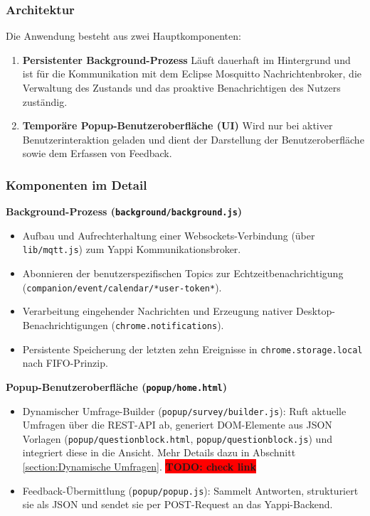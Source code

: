 \documentclass[12pt,a4paper]{report}
\newcommand{\todo}[1]{\colorbox{red}{\textbf{TODO: #1}}\\}
\begin{document}
    \subsubsection{Architektur}
        Die Anwendung besteht aus zwei Hauptkomponenten:
        \begin{enumerate}
          \item \textbf{Persistenter Background-Prozess}
                Läuft dauerhaft im Hintergrund und ist für die Kommunikation mit dem Eclipse Mosquitto Nachrichtenbroker, die Verwaltung des Zustands
                und das proaktive Benachrichtigen des Nutzers zuständig.
          \item \textbf{Temporäre Popup-Benutzeroberfläche (UI)}
                Wird nur bei aktiver Benutzerinteraktion geladen und dient der Darstellung der Benutzeroberfläche sowie dem Erfassen von Feedback.
        \end{enumerate}

    \subsubsection{Komponenten im Detail}
        \textbf{Background-Prozess (\texttt{background/background.js})} \\
            \begin{itemize}
              \item Aufbau und Aufrechterhaltung einer Websockets-Verbindung (über \texttt{lib/mqtt.js}) zum Yappi Kommunikationsbroker.
              \item Abonnieren der benutzerspezifischen Topics zur Echtzeitbenachrichtigung (\texttt{companion/event/calendar/*user-token*}).
              \item Verarbeitung eingehender Nachrichten und Erzeugung nativer Desktop-Benachrichtigungen (\texttt{chrome.notifications}).
              \item Persistente Speicherung der letzten zehn Ereignisse in \texttt{chrome.storage.local} nach FIFO-Prinzip.
            \end{itemize}


        \textbf{Popup-Benutzeroberfläche (\texttt{popup/home.html})} \\
            \begin{itemize}
              \item Dynamischer Umfrage-Builder (\texttt{popup/survey/builder.js}):
                    Ruft aktuelle Umfragen über die REST-API ab, generiert DOM-Elemente aus JSON Vorlagen (\texttt{popup/questionblock.html},
                    \texttt{popup/questionblock.js}) und integriert diese in die Ansicht.
                    Mehr Details dazu in Abschnitt \ref{section:Dynamische Umfragen}.
                    \todo{check link}
              \item Feedback-Übermittlung (\texttt{popup/popup.js}):
                    Sammelt Antworten, strukturiert sie als JSON und sendet sie per POST-Request an das Yappi-Backend.
            \end{itemize}
\end{document}
